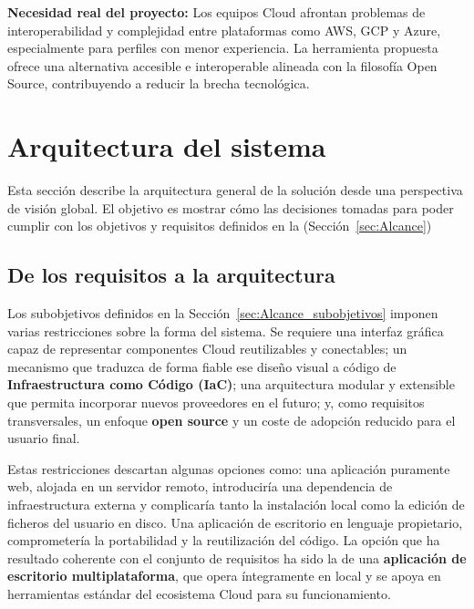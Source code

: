 \documentclass{article}
\begin{document}
    \justify
    \textbf{Necesidad real del proyecto:} Los equipos Cloud afrontan problemas de
    interoperabilidad y complejidad entre plataformas como AWS, GCP y Azure,
    especialmente para perfiles con menor experiencia. La herramienta propuesta
    ofrece una alternativa accesible e interoperable alineada con la filosofía
    Open Source, contribuyendo a reducir la brecha tecnológica.


    \newpage
    \section{Arquitectura del sistema}
    {
        \setlength{\parskip}{1em}

        \justify
        Esta sección describe la arquitectura general de la solución desde una perspectiva de visión global. El
        objetivo es mostrar cómo las decisiones tomadas para poder cumplir con los objetivos y requisitos definidos en la (Sección~\ref{sec:Alcance})

        \subsection{De los requisitos a la arquitectura}
        \justify
        Los subobjetivos definidos en la Sección~\ref{sec:Alcance_subobjetivos} imponen varias
        restricciones sobre la forma del sistema. Se requiere una interfaz gráfica
        capaz de representar componentes Cloud reutilizables y conectables; un
        mecanismo que traduzca de forma fiable ese diseño visual a código de
        \textbf{Infraestructura como Código (IaC)}; una arquitectura modular y
        extensible que permita incorporar nuevos proveedores en el futuro; y, como
        requisitos transversales, un enfoque \textbf{open source} y un coste de
        adopción reducido para el usuario final.

        \justify
        Estas restricciones descartan algunas opciones como: una aplicación puramente web, alojada en un servidor remoto,
        introduciría una dependencia de infraestructura externa y complicaría tanto
        la instalación local como la edición de ficheros del usuario en disco. Una
        aplicación de escritorio en lenguaje propietario, comprometería
        la portabilidad y la reutilización del código. La opción que ha resultado
        coherente con el conjunto de requisitos ha sido la de una \textbf{aplicación
        de escritorio multiplataforma}, que opera íntegramente en local y se apoya en herramientas estándar del ecosistema
        Cloud para su funcionamiento.

}
\end{document}
